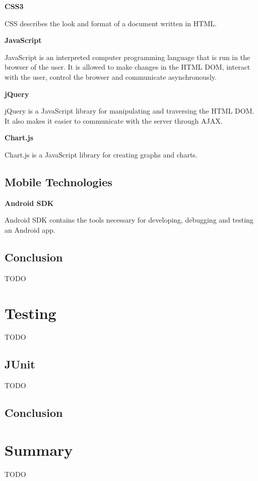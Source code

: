 \textbf{CSS3}

CSS describes the look and format of a document written in HTML.

\textbf{JavaScript}

JavaScript is an interpreted computer programming language that is run in the browser of the user.
It is allowed to make changes in the HTML DOM, interact with the user, control the browser and communicate asynchronously.

\textbf{jQuery}

jQuery is a JavaScript library for manipulating and traversing the HTML DOM.
It also makes it easier to communicate with the server through AJAX.

\textbf{Chart.js}

Chart.js is a JavaScript library for creating graphs and charts.

\subsection{Mobile Technologies}

\textbf{Android SDK}

Android SDK contains the tools necessary for developing, debugging and testing an Android app.

\subsection{Conclusion}

TODO

\section{Testing}

TODO

\subsection{JUnit}

TODO

\subsection{Conclusion}


\section{Summary}

TODO

